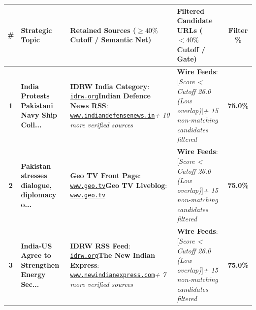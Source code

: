 \documentclass[8.5pt,a4paper]{article}
\begin{document}
\vspace{1pt}

{\fontsize{6.8pt}{7.6pt}\selectfont
\renewcommand{\arraystretch}{0.90}
\begin{tabularx}{\textwidth}{@{} c p{3.4cm} p{6.8cm} p{6.8cm} c @{}}
\toprule
\rowcolor{tableheader}
\textbf{\#} & \textbf{Strategic Topic} & \textbf{Retained Sources ($\ge 40\%$ Cutoff / Semantic Net)} & \textbf{Filtered Candidate URLs ($< 40\%$ Cutoff / Gate)} & \textbf{Filter \%} \\
\midrule

\rowcolor{rowlight}
\textbf{1} & \textbf{India Protests Pakistani Navy Ship Coll...} & \textbf{IDRW India Category}: \href{https://idrw.org/india-protests-after-pakistani-navy-ship-collision/#respond}{\texttt{idrw.org}}\newline \textbf{Indian Defence News RSS}: \href{https://www.indiandefensenews.in/2026/09/india-summons-pakistan-envoy-after.html}{\texttt{www.indiandefensenews.in}}\newline \textit{+ 10 more verified sources} & \textbf{Wire Feeds}: [\textit{Score < Cutoff 26.0 (Low overlap)}]\newline \textit{+ 15 non-matching candidates filtered} & \textbf{75.0\%} \\
\rowcolor{rowdark}
\textbf{2} & \textbf{Pakistan stresses dialogue, diplomacy o...} & \textbf{Geo TV Front Page}: \href{https://www.geo.tv/liveblog/israeliran-war-live-updates}{\texttt{www.geo.tv}}\newline \textbf{Geo TV Liveblog}: \href{https://www.geo.tv/liveblog/israeliran-war-live-updates#story34550}{\texttt{www.geo.tv}} & \textbf{Wire Feeds}: [\textit{Score < Cutoff 26.0 (Low overlap)}]\newline \textit{+ 15 non-matching candidates filtered} & \textbf{75.0\%} \\
\rowcolor{rowlight}
\textbf{3} & \textbf{India-US Agree to Strengthen Energy Sec...} & \textbf{IDRW RSS Feed}: \href{https://idrw.org/india-us-agree-to-strengthen-energy-security-partnership/}{\texttt{idrw.org}}\newline \textbf{The New Indian Express}: \href{https://www.newindianexpress.com/india/2026/Sep/17/will-protect-trade-economic-interests-india-committed-to-energy-security-says-mea-amid-us-tariff-threat}{\texttt{www.newindianexpress.com}}\newline \textit{+ 7 more verified sources} & \textbf{Wire Feeds}: [\textit{Score < Cutoff 26.0 (Low overlap)}]\newline \textit{+ 15 non-matching candidates filtered} & \textbf{75.0\%} \\

\end{tabularx}}
\end{document}
